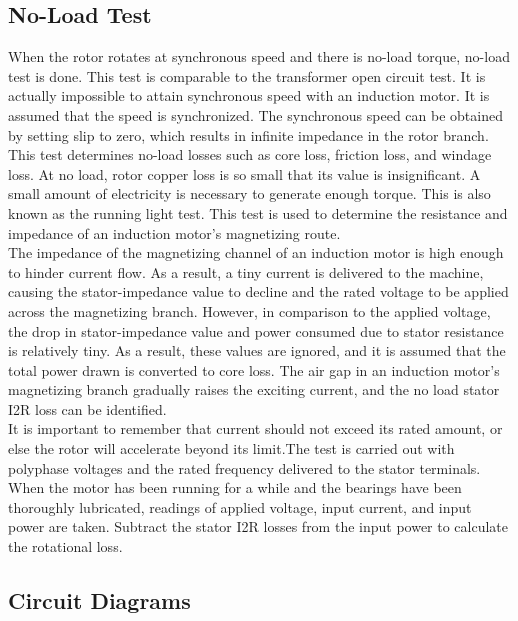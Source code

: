 \documentclass[12pt]{article}
\begin{document}
\subsection*{No-Load Test}
When the rotor rotates at synchronous speed and there is no-load torque, no-load test is done. This test is comparable to the transformer open circuit test. It is actually impossible to attain synchronous speed with an induction motor. It is assumed that the speed is synchronized. The synchronous speed can be obtained by setting slip to zero, which results in infinite impedance in the rotor branch.\\
This test determines no-load losses such as core loss, friction loss, and windage loss. At no load, rotor copper loss is so small that its value is insignificant. A small amount of electricity is necessary to generate enough torque. This is also known as the running light test. This test is used to determine the resistance and impedance of an induction motor's magnetizing route.\\
The impedance of the magnetizing channel of an induction motor is high enough to hinder current flow. As a result, a tiny current is delivered to the machine, causing the stator-impedance value to decline and the rated voltage to be applied across the magnetizing branch. However, in comparison to the applied voltage, the drop in stator-impedance value and power consumed due to stator resistance is relatively tiny. As a result, these values are ignored, and it is assumed that the total power drawn is converted to core loss. The air gap in an induction motor's magnetizing branch gradually raises the exciting current, and the no load stator I2R loss can be identified.\\
It is important to remember that current should not exceed its rated amount, or else the rotor will accelerate beyond its limit.The test is carried out with polyphase voltages and the rated frequency delivered to the stator terminals. When the motor has been running for a while and the bearings have been thoroughly lubricated, readings of applied voltage, input current, and input power are taken. Subtract the stator I2R losses from the input power to calculate the rotational loss.\cite{noload}

\subsection*{Circuit Diagrams}

\end{document}
